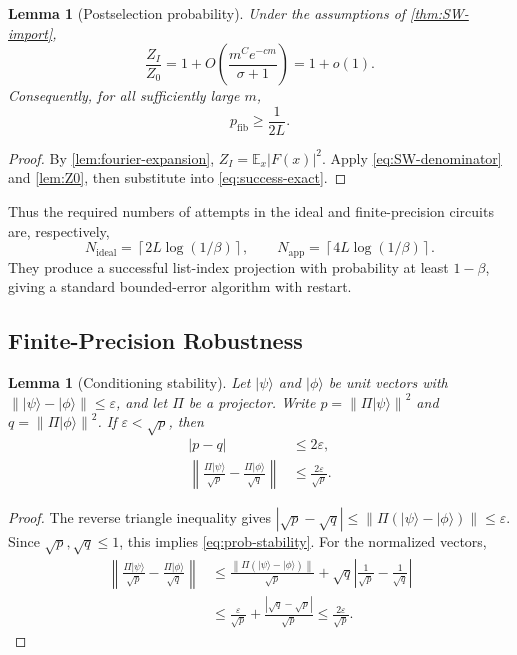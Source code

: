 \documentclass[10pt,a4paper]{amsart}
\newtheorem{lemma}[theorem]{Lemma}
\newcommand{\E}{\mathbb{E}}
\newcommand{\ket}[1]{\lvert #1\rangle}
\newcommand{\abs}[1]{\left\lvert #1\right\rvert}
\newcommand{\norm}[1]{\left\lVert #1\right\rVert}
\begin{document}
\begin{lemma}[Postselection probability]
\label{lem:norm-transfer}
Under the assumptions of \cref{thm:SW-import},
\begin{equation}
   \frac{Z_I}{Z_0}=1+O\!\left(\frac{m^Ce^{-cm}}{\sigma+1}\right)=1+o(1).
   \label{eq:norm-ratio}
\end{equation}
Consequently, for all sufficiently large $m$,
\begin{equation}
   p_{\mathrm{fib}}\ge\frac1{2L}.
   \label{eq:success-lower-bound}
\end{equation}
\end{lemma}

\begin{proof}
By \cref{lem:fourier-expansion}, $Z_I=\E_x\abs{F(x)}^2$.  Apply \cref{eq:SW-denominator} and \cref{lem:Z0}, then substitute into \cref{eq:success-exact}.
\end{proof}

Thus the required numbers of attempts in the ideal and finite-precision circuits are, respectively,
\[
   N_{\mathrm{ideal}}=\left\lceil2L\log(1/\beta)\right\rceil,
   \qquad
   N_{\mathrm{app}}=\left\lceil4L\log(1/\beta)\right\rceil.
\]
They produce a successful list-index projection with probability at least $1-\beta$, giving a standard bounded-error algorithm with restart.

\subsection{Finite-Precision Robustness}

\begin{lemma}[Conditioning stability]
\label{lem:conditioning-stability}
Let $\ket\psi$ and $\ket\phi$ be unit vectors with $\norm{\ket\psi-\ket\phi}\le\varepsilon$, and let $\Pi$ be a projector.  Write $p=\norm{\Pi\ket\psi}^2$ and $q=\norm{\Pi\ket\phi}^2$.  If $\varepsilon<\sqrt p$, then
\begin{align}
   \abs{p-q}&\le2\varepsilon,
   \label{eq:prob-stability}\\
   \norm{\frac{\Pi\ket\psi}{\sqrt p}-
          \frac{\Pi\ket\phi}{\sqrt q}}
      &\le\frac{2\varepsilon}{\sqrt p}.
   \label{eq:conditional-stability}
\end{align}
\end{lemma}

\begin{proof}
The reverse triangle inequality gives
$\abs{\sqrt p-\sqrt q}\le\norm{\Pi(\ket\psi-\ket\phi)}\le\varepsilon$.
Since $\sqrt p,\sqrt q\le1$, this implies \cref{eq:prob-stability}.  For the normalized vectors,
\begin{align*}
  \norm{\frac{\Pi\ket\psi}{\sqrt p}-
         \frac{\Pi\ket\phi}{\sqrt q}}
  &\le
    \frac{\norm{\Pi(\ket\psi-\ket\phi)}}{\sqrt p}
    +\sqrt q\abs{\frac1{\sqrt p}-\frac1{\sqrt q}}\\
  &\le\frac{\varepsilon}{\sqrt p}
       +\frac{\abs{\sqrt q-\sqrt p}}{\sqrt p}
   \le\frac{2\varepsilon}{\sqrt p}.
\end{align*}
\end{proof}
\end{document}
